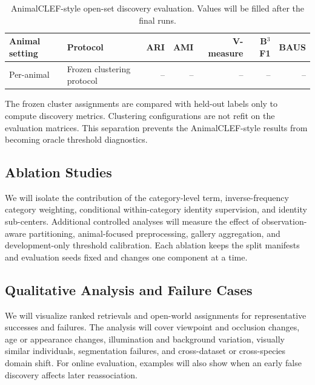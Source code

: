 \begin{table}[t]
\centering
\caption{AnimalCLEF-style open-set discovery evaluation. Values will be
filled after the final runs.}
\label{tab:open_world_results}
\begin{tabular}{l l r r r r r}
\toprule
\textbf{Animal setting} & \textbf{Protocol} & \textbf{ARI} &
\textbf{AMI} & \textbf{V-measure} & \textbf{B$^3$ F1} &
\textbf{BAUS} \\
\midrule
Per-animal & Frozen clustering protocol & -- & -- & -- & -- & -- \\
\bottomrule
\end{tabular}
\end{table}

The frozen cluster assignments are compared with held-out labels only to
compute discovery metrics. Clustering configurations are not refit on the
evaluation matrices. This separation prevents the AnimalCLEF-style results
from becoming oracle threshold diagnostics.

\subsection{Ablation Studies}
\label{sec:results:ablations}

We will isolate the contribution of the category-level term, inverse-frequency
category weighting, conditional within-category identity supervision, and
identity sub-centers. Additional controlled analyses will measure the effect
of observation-aware partitioning, animal-focused preprocessing, gallery
aggregation, and development-only threshold calibration. Each ablation keeps
the split manifests and evaluation seeds fixed and changes one component at a
time.

\subsection{Qualitative Analysis and Failure Cases}
\label{sec:results:qualitative}

We will visualize ranked retrievals and open-world assignments for
representative successes and failures. The analysis will cover viewpoint and
occlusion changes, age or appearance changes, illumination and background
variation, visually similar individuals, segmentation failures, and
cross-dataset or cross-species domain shift. For online evaluation, examples
will also show when an early false discovery affects later reassociation.
